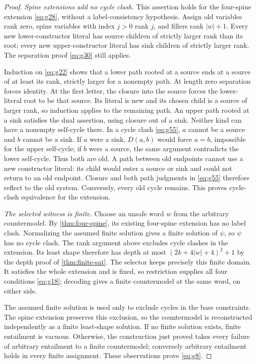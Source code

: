 \begin{proof}
\par\noindent\emph{Spine extensions add no cycle clash.} This assertion holds for
the four-spine extension \eqref{eq:g28}, without a label-consistency
hypothesis. Assign old
variables rank zero, spine variables with index $j>0$ rank $j$, and
fillers rank $|w|+1$. Every new lower-constructor literal
has source children of strictly larger rank than its root; every new
upper-constructor literal has sink children of strictly larger rank.
The separation proof \eqref{eq:g30} still applies.

Induction on \eqref{eq:g22} shows that a lower path rooted at a source
ends at a source of at least its rank, strictly larger for a nonempty path.
At length zero separation forces identity. At the first letter, the closure
into the source forces the lower-literal root to be that source. Its literal
is new and its chosen child is a source of larger rank, so induction
applies to the remaining path. An upper path rooted at a sink satisfies
the dual assertion, using closure out of a sink. Neither kind can have a nonempty self-cycle there. In a
cycle clash \eqref{eq:g55}, $a$ cannot be a source and $b$ cannot be a sink.
If $a$ were a sink, $D(a,b)$ would force $a=b$, impossible for
the upper self-cycle; if $b$ were a source, the same argument contradicts
the lower self-cycle. Thus both are old. A path between old endpoints
cannot use a new constructor literal: its child would enter a source
or sink and could not return to an old endpoint. Closure and both path
judgments in \eqref{eq:g55} therefore reflect to the old system. Conversely, every
old cycle remains. This proves cycle-clash equivalence for the extension.

\par\noindent\emph{The selected witness is finite.}
Choose an unsafe word $w$ from the arbitrary countermodel.
By \cref{thm:four-spine}, its existing four-spine extension has no label
clash. Normalizing the assumed finite solution gives a finite solution of
$\psi$, so $\psi$ has no cycle clash. The rank argument
above excludes cycle clashes in the extension. Its least shape therefore
has depth at most $(2k+4|w|+4)^2+1$ by the depth proof of
\cref{thm:finite-sat}. The selector keeps precisely this finite domain.
It satisfies the whole extension and is fixed, so restriction supplies
all four conditions \eqref{eq:g18}; decoding gives a finite countermodel
at the same word, on either side.

The assumed finite solution is used only to exclude cycles in the base
constraints. The spine extension preserves this exclusion, so the
countermodel is reconstructed independently as a finite least-shape solution.
If no finite solution exists, finite entailment is vacuous. Otherwise, the construction
just proved takes every failure of arbitrary entailment to a finite
countermodel; conversely arbitrary entailment holds in every finite
assignment. These observations prove \eqref{eq:g8}.
\end{proof}

